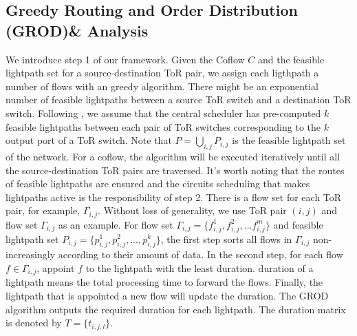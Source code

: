 \subsection{Greedy Routing and Order Distribution (GROD)\& Analysis }\label{sec:alg_coflow}
We introduce step 1 of our framework. Given the Coflow $C$ and the feasible lightpath set for a source-destination ToR pair, we assign each ligthpath a number of flows with an greedy algorithm. There might be an exponential number of feasible lightpaths between a source ToR switch and a destination ToR switch. Following \cite{hong2013achieving} \cite{al2010hedera}, we assume that the central scheduler has pre-computed $k$ feasible lightpaths between each pair of ToR switches corresponding to the $k$ output port of a ToR switch. Note that $P=\bigcup_{i,j}P_{i,j}$ is the feasible lightpath set of the network. For a coflow, the algorithm will be executed iteratively until all the source-destination ToR pairs are traversed. It's worth noting that the routes of feasible lightpaths are ensured and the circuits scheduling that makes lightpaths active is the responsibility of step 2. There is a flow set for each ToR pair, for example, $\Gamma_{i,j}$. Without loss of generality, we use ToR pair $(i,j)$ and flow set $\Gamma_{i,j}$ as an example. For flow set $\Gamma_{i,j}=\{f_{i,j}^1,f_{i,j}^2,...f_{i,j}^m\}$ and feasible lightpath set $P_{i,j}=\{p_{i,j}^1,p_{i,j}^2,...,p_{i,j}^k\}$, the first step sorts all flows in $\Gamma_{i,j}$ non-increasingly according to their amount of data. In the second step, for each flow $f\in \Gamma_{i,j}$, appoint $f$ to the lightpath with the least duration. duration of a lightpath means the total processing time to forward the flows. Finally, the lightpath that is appointed a new flow will update the duration. The GROD algorithm outputs the required duration for each lightpath. The duration matrix is denoted by $T=\{t_{i,j,l}\}$.

